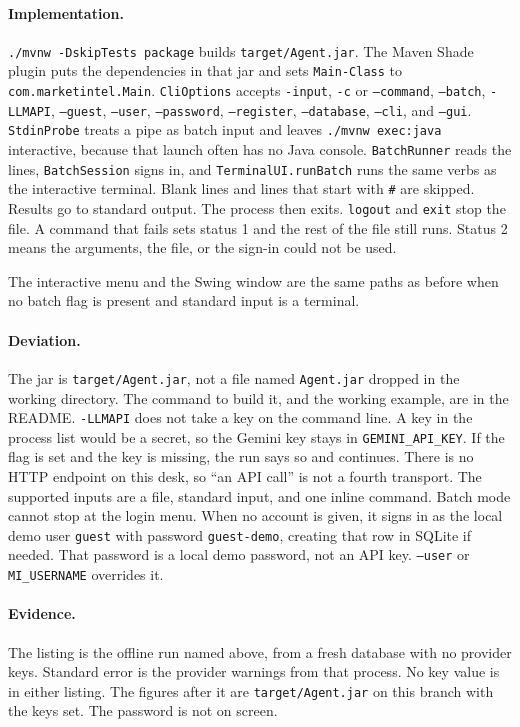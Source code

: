 \documentclass[11pt]{article}
\begin{document}
\paragraph{Implementation.}
\texttt{./mvnw -DskipTests package} builds \texttt{target/Agent.jar}. The Maven Shade plugin puts the dependencies in that jar and sets \texttt{Main-Class} to \texttt{com.marketintel.Main}. \texttt{CliOptions} accepts \texttt{-input}, \texttt{-c} or \texttt{--command}, \texttt{--batch}, \texttt{-LLMAPI}, \texttt{--guest}, \texttt{--user}, \texttt{--password}, \texttt{--register}, \texttt{--database}, \texttt{--cli}, and \texttt{--gui}. \texttt{StdinProbe} treats a pipe as batch input and leaves \texttt{./mvnw exec:java} interactive, because that launch often has no Java console. \texttt{BatchRunner} reads the lines, \texttt{BatchSession} signs in, and \texttt{TerminalUI.runBatch} runs the same verbs as the interactive terminal. Blank lines and lines that start with \texttt{\#} are skipped. Results go to standard output. The process then exits. \texttt{logout} and \texttt{exit} stop the file. A command that fails sets status 1 and the rest of the file still runs. Status 2 means the arguments, the file, or the sign-in could not be used.

The interactive menu and the Swing window are the same paths as before when no batch flag is present and standard input is a terminal.

\paragraph{Deviation.}
The jar is \texttt{target/Agent.jar}, not a file named \texttt{Agent.jar} dropped in the working directory. The command to build it, and the working example, are in the README. \texttt{-LLMAPI} does not take a key on the command line. A key in the process list would be a secret, so the Gemini key stays in \texttt{GEMINI\_API\_KEY}. If the flag is set and the key is missing, the run says so and continues. There is no HTTP endpoint on this desk, so ``an API call'' is not a fourth transport. The supported inputs are a file, standard input, and one inline command. Batch mode cannot stop at the login menu. When no account is given, it signs in as the local demo user \texttt{guest} with password \texttt{guest-demo}, creating that row in SQLite if needed. That password is a local demo password, not an API key. \texttt{--user} or \texttt{MI\_USERNAME} overrides it.

\paragraph{Evidence.}
The listing is the offline run named above, from a fresh database with no provider keys. Standard error is the provider warnings from that process. No key value is in either listing. The figures after it are \texttt{target/Agent.jar} on this branch with the keys set. The password is not on screen.
\end{document}
